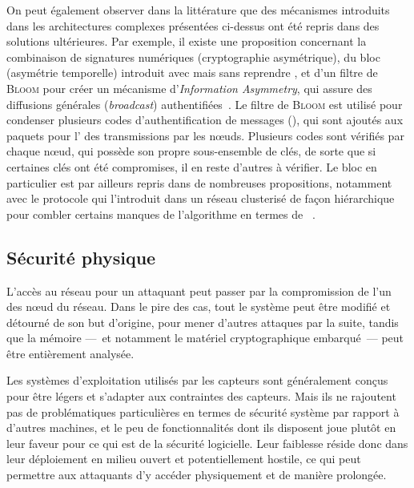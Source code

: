 On peut également observer dans la littérature que des mécanismes introduits dans les architectures complexes présentées ci-dessus ont été repris dans des solutions ultérieures.
Par exemple, il existe une proposition concernant la combinaison de signatures numériques (cryptographie asymétrique), du bloc  (asymétrie temporelle) introduit avec  mais sans reprendre , et d'un filtre de \textsc{Bloom} pour créer un mécanisme d'\textit{Information Asymmetry}, qui assure des diffusions générales (\textit{broadcast}) authentifiées~\cite{SLS10}.
Le filtre de \textsc{Bloom} est utilisé pour condenser plusieurs codes d'authentification de messages (\macc), qui sont ajoutés aux paquets pour l' des transmissions par les nœuds.
Plusieurs codes sont vérifiés par chaque nœud, qui possède son propre sous-ensemble de clés, de sorte que si certaines clés ont été compromises, il en reste d'autres à vérifier.
Le bloc  en particulier est par ailleurs repris dans de nombreuses propositions, notamment avec le protocole  qui l'introduit dans un réseau clusterisé de façon hiérarchique pour combler certains manques de l'algorithme \leach en termes de \secu~\cite{OFVWBDL07}.

\subsection{Sécurité physique}

L'accès au réseau pour un attaquant peut passer par la compromission de l'un des nœud du réseau.
Dans le pire des cas, tout le système peut être modifié et détourné de son but d'origine, pour mener d'autres attaques par la suite, tandis que la mémoire ---~et notamment le matériel cryptographique embarqué~--- peut être entièrement analysée.

Les systèmes d'exploitation utilisés par les capteurs sont généralement conçus pour être légers et s'adapter aux contraintes des capteurs.
Mais ils ne rajoutent pas de problématiques particulières en termes de sécurité système par rapport à d'autres machines, et le peu de fonctionnalités dont ils disposent joue plutôt en leur faveur pour ce qui est de la sécurité logicielle.
Leur faiblesse réside donc dans leur déploiement en milieu ouvert et potentiellement hostile, ce qui peut permettre aux attaquants d'y accéder physiquement et de manière prolongée.

